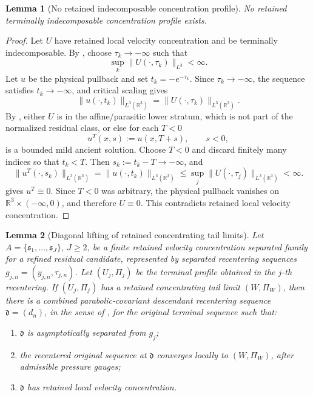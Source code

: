 \documentclass[11pt]{amsart}
\numberwithin{equation}{section}
\theoremstyle{plain}
\newtheorem{lemma}[lemma]{Lemma}
\theoremstyle{definition}
\theoremstyle{remark}
\newcommand{\R}{\mathbb R}
\begin{document}
\begin{lemma}[No retained indecomposable concentration profile]
\label{lem:no-atomic-active}
No retained terminally indecomposable concentration profile exists.
\end{lemma}

\begin{proof}
Let \(U\) have retained local velocity concentration and be terminally indecomposable.  By
, choose \(\tau_k\to-\infty\) such that
\[
   \sup_k\|U(\cdot,\tau_k)\|_{L^3}<\infty .
\]
Let \(u\) be the physical pullback and set \(t_k=-e^{-\tau_k}\).  Since
\(\tau_k\to-\infty\), the sequence satisfies \(t_k\to-\infty\), and
critical scaling gives
\[
   \|u(\cdot,t_k)\|_{L^3(\R^3)}
   =
   \|U(\cdot,\tau_k)\|_{L^3(\R^3)}.
\]
By , either \(U\) is in the affine/parasitic
lower stratum, which is not part of the normalized residual class, or else for
each \(T<0\)
\[
   u^T(x,s):=u(x,T+s),\qquad s<0,
\]
is a bounded mild ancient solution.  Choose \(T<0\) and discard finitely many
indices so that \(t_k<T\).  Then \(s_k:=t_k-T\to-\infty\), and
\[
   \|u^T(\cdot,s_k)\|_{L^3(\R^3)}
   =
   \|u(\cdot,t_k)\|_{L^3(\R^3)}
   \le \sup_j\|U(\cdot,\tau_j)\|_{L^3(\R^3)}<\infty .
   \]
 gives \(u^T\equiv0\).  Since \(T<0\) was arbitrary, the
physical pullback vanishes on \(\mathbb R^3\times(-\infty,0)\), and therefore
\(U\equiv0\).  This contradicts retained local velocity concentration.
\end{proof}

\begin{lemma}[Diagonal lifting of retained concentrating tail limits]
\label{lem:diagonal-lifting-descendants}
Let \(A=\{\mathfrak s_1,\dots,\mathfrak s_J\}\), \(J\ge2\), be a finite
retained velocity concentration separated family for a refined residual candidate, represented by
separated recentering sequences \(g_{j,n}=(y_{j,n},\tau_{j,n})\).  Let
\((U_j,\Pi_j)\) be the terminal profile obtained in the \(j\)-th recentering.  If
\((U_j,\Pi_j)\) has a retained concentrating tail limit \((W,\Pi_W)\), then
there is a combined parabolic-covariant descendant recentering sequence
\(\mathfrak d=(d_n)\), in the sense of
, for the original terminal
sequence such that:
\begin{enumerate}[label=(\roman*)]
   \item \(\mathfrak d\) is asymptotically separated from \(g_j\);
   \item the recentered original sequence at \(\mathfrak d\) converges locally
   to \((W,\Pi_W)\), after admissible pressure gauges;
   \item \(\mathfrak d\) has retained local velocity concentration.
\end{enumerate}
\end{lemma}
\end{document}
